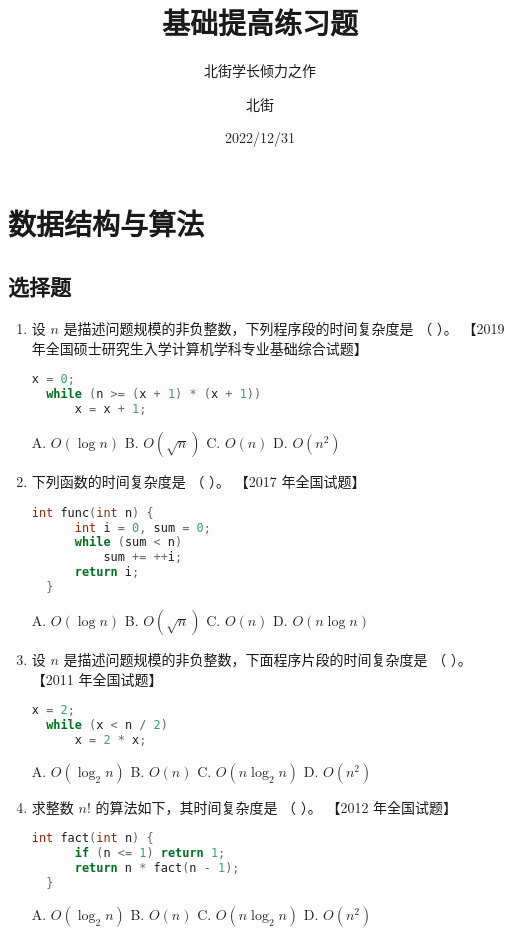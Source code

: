 \documentclass[lang=cn,newtx,10pt,scheme=chinese]{elegantbook}
\title{基础提高练习题}
\subtitle{北街学长倾力之作}
\author{北街}
\date{2022/12/31}
\begin{document}
\maketitle
\frontmatter

\tableofcontents

\mainmatter

\chapter{数据结构与算法}
\section{选择题}

\begin{enumerate}

  \item 设 $n$ 是描述问题规模的非负整数，下列程序段的时间复杂度是 （ \quad）。  
  【2019 年全国硕士研究生入学计算机学科专业基础综合试题】  
  \begin{lstlisting}[language=C]
  x = 0;
  while (n >= (x + 1) * (x + 1))
      x = x + 1;
  \end{lstlisting}
  A. $O(\log n)$ \quad B. $O(\sqrt{n})$ \quad C. $O(n)$ \quad D. $O(n^2)$

  \item 下列函数的时间复杂度是 （ \quad）。  
  【2017 年全国试题】  
  \begin{lstlisting}[language=C]
  int func(int n) {
      int i = 0, sum = 0;
      while (sum < n)
          sum += ++i;
      return i;
  }
  \end{lstlisting}
  A. $O(\log n)$ \quad B. $O(\sqrt{n})$ \quad C. $O(n)$ \quad D. $O(n \log n)$

  \item 设 $n$ 是描述问题规模的非负整数，下面程序片段的时间复杂度是 （ \quad）。  
  【2011 年全国试题】  
  \begin{lstlisting}[language=C]
  x = 2;
  while (x < n / 2)
      x = 2 * x;
  \end{lstlisting}
  A. $O(\log_2 n)$ \quad B. $O(n)$ \quad C. $O(n \log_2 n)$ \quad D. $O(n^2)$

  \item 求整数 $n!$ 的算法如下，其时间复杂度是 （ \quad）。  
  【2012 年全国试题】  
  \begin{lstlisting}[language=C]
  int fact(int n) {
      if (n <= 1) return 1;
      return n * fact(n - 1);
  }
  \end{lstlisting}
  A. $O(\log_2 n)$ \quad B. $O(n)$ \quad C. $O(n \log_2 n)$ \quad D. $O(n^2)$


\end{enumerate}
\end{document}
